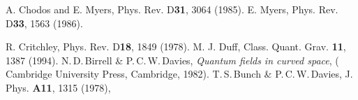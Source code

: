\documentclass[a4paper,aps,preprint,groupedaddress,showpacs]{revtex4}
\begin{document}
\begin{thebibliography}{}
A. Chodos and E. Myers,  Phys. Rev. D{\bf 31}, 3064 (1985).
E. Myers,  Phys. Rev. D{\bf 33}, 1563 (1986).


R. Critchley, Phys. Rev. D{\bf 18}, 1849 (1978).  
 M. J. Duff, Class. Quant. Grav. {\bf 11}, 1387 (1994).
N.\,D.\,Birrell \& P.\,C.\,W.\,Davies, 
{\it Quantum fields in curved space}, ( Cambridge University Press, Cambridge, 1982). 
T.\,S.\,Bunch \& P.\,C.\,W.\,Davies, J. Phys. {\bf A11}, 1315 (1978),
\end{thebibliography}
\end{document}
